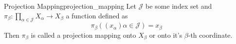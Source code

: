 \begin{definition}
{Projection Mapping}{projection_mapping}
Let \(\mathcal{J} \) be some index set and \(\pi _{\beta} : \prod _{
\alpha \in \mathcal{J}} X _{\alpha} \to X _{\beta} \) a function
defined as
\[
\pi _{\beta} \left(\left(x _{\alpha}\right) \alpha \in \mathcal{J}
\right) = x _{\beta}
\]
Then \( \pi  _{ \beta  }  \) is called a projection mapping onto \( X _{ \beta }
\) or onto it's \( \beta \)-th coordinate.
\end{definition}
